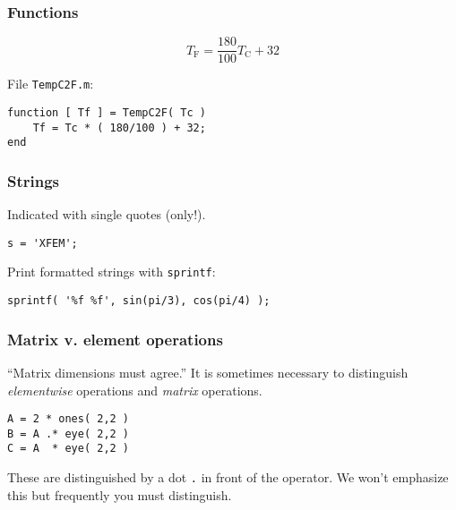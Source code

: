 \documentclass[11pt]{beamer}
\begin{document}
\begin{frame}[fragile]
  \frametitle{Functions}
  \Enlarge

$$
T_{\text{F}} = \frac{180}{100} T_{\text{C}} + 32
$$

File \texttt{TempC2F.m}:
  \begin{Verbatim}
function [ Tf ] = TempC2F( Tc )
    Tf = Tc * ( 180/100 ) + 32;
end
  \end{Verbatim}
\end{frame}

\begin{frame}[fragile]
  \frametitle{Strings}
  \Enlarge

  \begin{enumerate}
  \myitem  Indicated with single quotes (only!).
  \end{enumerate}
  \begin{Verbatim}
s = 'XFEM';
  \end{Verbatim}
  \begin{enumerate}
  \myitem  Print formatted strings with \texttt{sprintf}:
  \end{enumerate}
  \begin{Verbatim}
sprintf( '%f %f', sin(pi/3), cos(pi/4) );
  \end{Verbatim}
\end{frame}

\begin{frame}[fragile]
  \frametitle{Matrix v. element operations}
  \Enlarge

  \begin{enumerate}
  \myitem  ``Matrix dimensions must agree.''
  \myitem  It is sometimes necessary to distinguish \emph{elementwise} operations and \emph{matrix} operations. %
  \end{enumerate}
  \begin{Verbatim}
A = 2 * ones( 2,2 )
B = A .* eye( 2,2 )
C = A  * eye( 2,2 )
  \end{Verbatim}
  \begin{enumerate}
  \myitem  These are distinguished by a dot \texttt{.} in front of the operator.
  \myitem  We won't emphasize this but frequently you must distinguish.
  \end{enumerate}
\end{frame}
\end{document}
